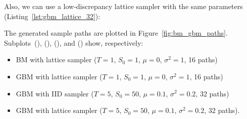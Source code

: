 

Also, we can use a low‐discrepancy lattice sampler with the same parameters
(Listing~\ref{lst:gbm_lattice_32}): 

The generated sample paths are plotted in Figure~\ref{fig:bm_gbm_paths}.
Subplots~(), (),
(), and () show, respectively: 

\begin{itemize}
    \item BM with lattice sampler ($T=1$, $S_0=1$, $\mu=0$, $\sigma^2=1$, 16
    paths)
    \item GBM with lattice sampler ($T=1$, $S_0=1$, $\mu=0$, $\sigma^2=1$, 16
    paths)
    \item GBM with IID sampler ($T=5$, $S_0=50$, $\mu=0.1$, $\sigma^2=0.2$, 32
    paths)
    \item GBM with lattice sampler ($T=5$, $S_0=50$, $\mu=0.1$, $\sigma^2=0.2$,
    32 paths).
\end{itemize}

